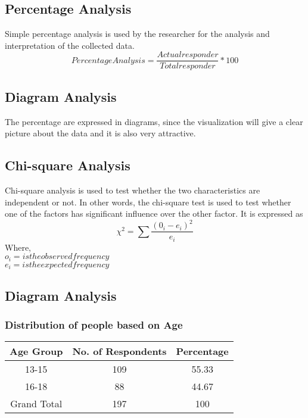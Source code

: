 \documentclass{article}
\begin{document}
\subsection{Percentage Analysis}
Simple percentage analysis is used by the researcher for the analysis and interpretation of the collected data.
\begin{equation}
   Percentage Analysis =  \frac{Actual responder}{Total responder} * 100%
\end{equation}
\subsection{Diagram Analysis}
The percentage are expressed in diagrams, since the visualization will give a clear picture about the data and it is also very attractive.
\subsection{Chi-square Analysis}
Chi-square analysis is used to test whether the two characteristics are independent or not. In other words, the chi-square test is used to test whether one of the factors has significant influence over the other factor. It is expressed as
\begin{equation}
   \chi^2 = \sum \frac{(0_i - e_i)^2}{e_i}
\end{equation}
Where, \\
    $o_i = is the observed frequency$ \\
    $e_i = is the expected frequency $

\subsection{Diagram Analysis}
\subsubsection{Distribution of people based on Age}
\begin{tabular}{ |c|c|c| }
    \hline
    Age Group & No. of Respondents & Percentage \\
    \hline
    13-15 & 109 & 55.33 \\
    16-18 & 88 & 44.67 \\
    Grand Total & 197 & 100\\
    \hline 
\end{tabular}

    
\end{document}
